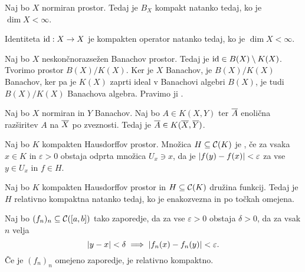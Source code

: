 \begin{izrek}
  Naj bo $X$ normiran prostor.
  Tedaj je $B_X$ kompakt natanko tedaj, ko je $\dim X < \infty$.
\end{izrek}

\begin{posledica}
  Identiteta $\operatorname{id}: X \to X$ je kompakten operator natanko tedaj, ko je $\dim X <
  \infty$.
\end{posledica}

Naj bo $X$ neskončnorazsežen Banachov prostor.
Tedaj je $\operatorname{id} \in B(X) \setminus K(X)$.
Tvorimo prostor $B(X) / K(X)$.
Ker je $X$ Banachov, je $B(X)/K(X)$ Banachov, ker pa je $K(X)$ zaprti ideal v
Banachovi algebri $B(X)$, je tudi $B(X) / K(X)$ Banachova algebra.
Pravimo ji .

\begin{trditev}
  Naj bo $X$ normiran in $Y$ Banachov.
  Naj bo $A \in K(X,Y)$ ter $\overline{A}$ enolična razširitev $A$ na $\overline{X}$ po
  zveznosti.
  Tedaj je $\overline{A} \in K(\overline{X}, \overline{Y})$.
\end{trditev}


\begin{definicija}
  Naj bo $K$ kompakten Hausdorffov prostor. Množica $H \subseteq \mathcal{C}(K)$ je
  , če za vsaka $x \in K$ in $\varepsilon > 0$ obstaja odprta
  množica $U_x \ni x$, da je $\left| f(y) - f(x) \right| < \varepsilon$ za vse $y \in
  U_x$ in $f \in H$.
\end{definicija}

\begin{izrek}
  Naj bo $K$ kompakten Hausdorffov prostor in $H \subseteq \mathcal{C}(K)$ družina
  funkcij.
  Tedaj je $H$ relativno kompaktna natanko tedaj, ko je enakozvezna in po točkah
  omejena.
\end{izrek}

\begin{izrek}
  Naj bo $(f_n)_n \subseteq \mathcal{C}([a,b])$ tako zaporedje, da za vse
  $\varepsilon > 0$ obstaja $\delta > 0$, da za vsak $n$ velja
  \[
	\left| y-x \right| < \delta \implies \left| f_n(x) - f_n(y) \right| < \varepsilon.
  \]
  Če je $(f_n)_n$ omejeno zaporedje, je relativno kompaktno.
\end{izrek}

